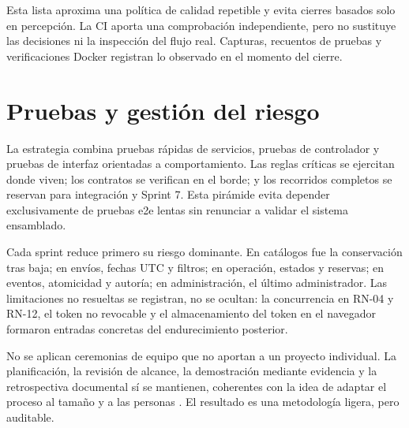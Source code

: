 Esta lista aproxima una política de calidad repetible y evita cierres basados solo en percepción. La CI aporta una comprobación independiente, pero no sustituye las decisiones ni la inspección del flujo real. Capturas, recuentos de pruebas y verificaciones Docker registran lo observado en el momento del cierre.

\section{Pruebas y gestión del riesgo}

La estrategia combina pruebas rápidas de servicios, pruebas de controlador y pruebas de interfaz orientadas a comportamiento. Las reglas críticas se ejercitan donde viven; los contratos se verifican en el borde; y los recorridos completos se reservan para integración y Sprint 7. Esta pirámide evita depender exclusivamente de pruebas \gls{e2e} lentas sin renunciar a validar el sistema ensamblado.

Cada sprint reduce primero su riesgo dominante. En catálogos fue la conservación tras baja; en envíos, fechas UTC y filtros; en operación, estados y reservas; en eventos, atomicidad y autoría; en administración, el último administrador. Las limitaciones no resueltas se registran, no se ocultan: la concurrencia en RN-04 y RN-12, el token no revocable y el almacenamiento del token en el navegador formaron entradas concretas del endurecimiento posterior.

No se aplican ceremonias de equipo que no aportan a un proyecto individual. La planificación, la revisión de alcance, la demostración mediante evidencia y la retrospectiva documental sí se mantienen, coherentes con la idea de adaptar el proceso al tamaño y a las personas \cite{cockburn2004}. El resultado es una metodología ligera, pero auditable.
